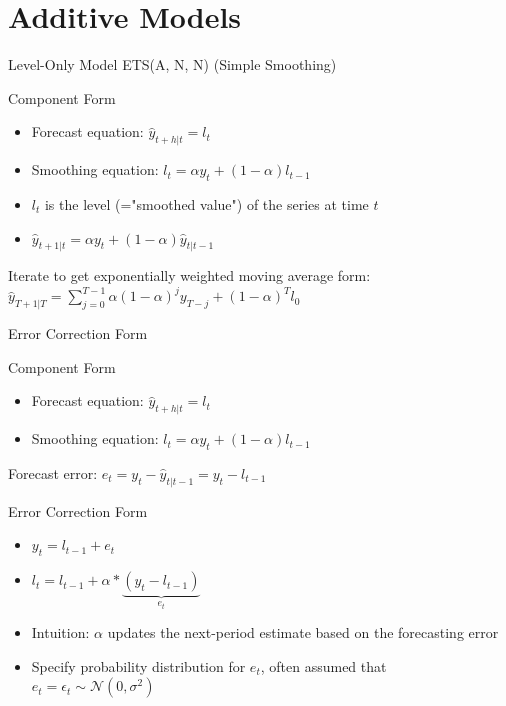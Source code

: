 \documentclass{beamer}
\begin{document}
\section{Additive Models}
\begin{frame}{Level-Only Model ETS(A, N, N) (Simple Smoothing)}
  \begin{block}{Component Form}
    \begin{itemize}
    \item Forecast equation: $\hat{y}_{t+h |t} = l_t$
    \item Smoothing equation: $l_t = \alpha y_t + (1-\alpha)l_{t-1}$
    \end{itemize}
  \end{block}

  \begin{itemize}
  \item $l_t$ is the level (="smoothed value") of the series at time $t$
  \item $\hat{y}_{t+1|t} = \alpha y_t + (1 - \alpha)\hat{y}_{t|t-1}$
  \end{itemize}
  Iterate to get exponentially weighted moving average form: $\hat{y}_{T+1|T} = \sum_{j=0}^{T-1}\alpha(1-\alpha)^j y_{T-j} + (1-\alpha)^Tl_0$  
\end{frame}

\begin{frame}{Error Correction Form}
  \begin{exampleblock}{Component Form}
    \begin{itemize}
    \item Forecast equation: $\hat{y}_{t+h |t} = l_t$
    \item Smoothing equation: $l_t = \alpha y_t + (1-\alpha)l_{t-1}$
    \end{itemize}
  \end{exampleblock}

  Forecast error: $e_t = y_t - \hat{y}_{t|t-1} = y_t - l_{t-1}$
  
  \begin{block}{Error Correction Form}
    \begin{itemize}
    \item $y_t = l_{t-1} + e_t$
    \item $l_t = l_{t-1} + \alpha*\underbrace{(y_t - l_{t-1})}_{e_t}$
    \end{itemize}

    \begin{itemize}
    \item Intuition: $\alpha$ updates the next-period estimate based on the forecasting error
    \item Specify probability distribution for $e_t$, often assumed that $e_t = \epsilon_t \sim \mathcal{N}(0, \sigma^2)$
    \end{itemize}
           
  \end{block}
  
\end{frame}
\end{document}
